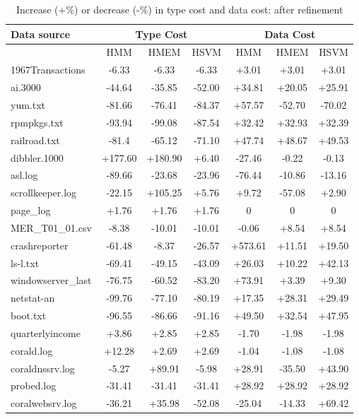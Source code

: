 \begin{table}[th]
\begin{center}
\begin{tabular}{|l||c|c|c||c|c|c|}\hline
Data source & \multicolumn{3}{|c||}{Type Cost} &
\multicolumn{3}{|c|}{Data Cost}\\ \hline & HMM & HMEM & HSVM & HMM &
HMEM & HSVM \\ \hline 1967Transactions & -6.33 & -6.33 & -6.33 &
+3.01 & +3.01 & +3.01    \\\hline ai.3000 & -44.64 & -35.85 & -52.00
& +34.81 & +20.05 & +25.91 \\ \hline yum.txt & -81.66 & -76.41 &
-84.37 & +57.57 & -52.70 & -70.02  \\ \hline rpmpkgs.txt & -93.94 &
-99.08 & -87.54 & +32.42 & +32.93 & +32.39 \\ \hline railroad.txt &
-81.4 & -65.12 & -71.10 & +47.74 & +48.67 & +49.53   \\ \hline
dibbler.1000 & +177.60 & +180.90 & +6.40 & -27.46 & -0.22 & -0.13
\\ \hline asl.log & -89.66 & -23.68 & -23.96 & -76.44 & -10.86 &
-13.16 \\ \hline scrollkeeper.log & -22.15 & +105.25 & +5.76 & +9.72
& -57.08 & +2.90  \\ \hline page\_log & +1.76 & +1.76 & +1.76 & 0 &
0 & 0 \\ \hline MER\_T01\_01.csv & -8.38 & -10.01 & -10.01 & -0.06 &
+8.54 & +8.54 \\ \hline crashreporter & -61.48 & -8.37 & -26.57 &
+573.61 & +11.51 & +19.50 \\ \hline ls-l.txt & -69.41 & -49.15 &
-43.09 & +26.03 & +10.22 & +42.13 \\ \hline windowserver\_last &
-76.75 & -60.52 & -83.20 & +73.91 & +3.39 & +9.30
\\ \hline netstat-an & -99.76 & -77.10 & -80.19 & +17.35 & +28.31 &
+29.49 \\ \hline boot.txt & -96.55 & -86.66 & -91.16 & +49.50 &
+32.54 & +47.95 \\ \hline quarterlyincome & +3.86 & +2.85 & +2.85 &
-1.70 & -1.98 & -1.98    \\ \hline corald.log & +12.28 & +2.69 &
+2.69 & -1.04 & -1.08 & -1.08   \\ \hline coraldnssrv.log  & -5.27 &
+89.91 & -5.98 & +28.91 & -35.50 & +43.90 \\ \hline
probed.log & -31.41 & -31.41 & -31.41 & +28.92 & +28.92 & +28.92 \\
\hline
coralwebsrv.log & -36.21 & +35.98 & -52.08 & -25.04 & -14.33 & +69.42   \\
               \hline
\end{tabular}
\caption{Increase (+\%) or decrease (-\%) in type cost and data
cost: after refinement} \label{tab:complexity2}
\end{center}
\end{table}

